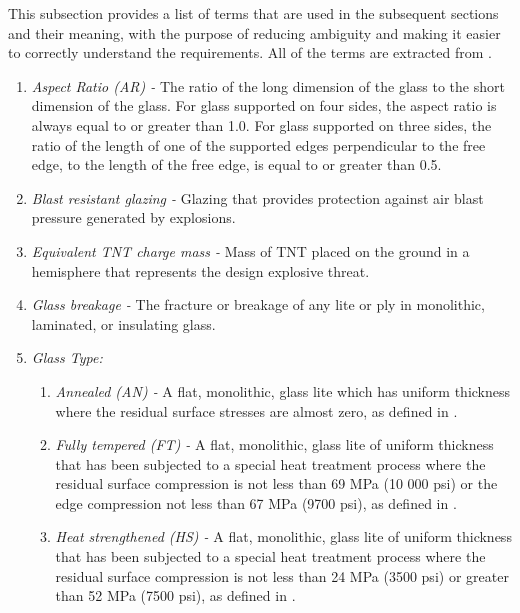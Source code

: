 \documentclass[12pt]{article}
\begin{document}
This subsection provides a list of terms that are used in the subsequent
sections and their meaning, with the purpose of reducing ambiguity and making it
easier to correctly understand the requirements.  All of the terms are extracted
from \cite{ASTM2009}.

\begin{enumerate}
\item \textit{Aspect Ratio (AR) -} The ratio of the long dimension of the
  glass to the short dimension of the glass.  For glass supported on four sides,
  the aspect ratio is always equal to or greater than 1.0. For glass supported
  on three sides, the ratio of the length of one of the supported edges
  perpendicular to the free edge, to the length of the free edge, is equal to or
  greater than 0.5.
  
\item \textit{Blast resistant glazing -} Glazing that provides protection 
against air blast pressure generated by explosions.

\item \textit{Equivalent TNT charge mass -} Mass of TNT placed on the ground in 
a hemisphere that represents the design explosive threat. 

\item \textit{Glass breakage -} The fracture or breakage of any lite or ply in
  monolithic, laminated, or insulating glass.
  
\item \textit{Glass Type:}
\begin{enumerate}

\item \textit{Annealed (AN) -} A flat, monolithic, glass lite which has uniform 
thickness where the residual surface stresses are almost zero, as defined in 
\cite{ASTM2016}.

\item \textit{Fully tempered (FT) -} A flat, monolithic, glass lite of 
uniform thickness that has been subjected to a special heat treatment process 
where the residual surface compression is not less than 69 MPa (10 000 psi) or 
the edge compression not less than 67 MPa (9700 psi), as defined in \cite{ASTM2012a}.

\item \textit{Heat strengthened (HS) -} A flat, monolithic, glass lite of 
uniform thickness that has been subjected to a special heat treatment process 
where the residual surface compression is not less than 24 MPa (3500 psi) or 
greater than 52 MPa (7500 psi), as defined in \cite{ASTM2012a}.


\end{enumerate}
\end{enumerate}
\end{document}
